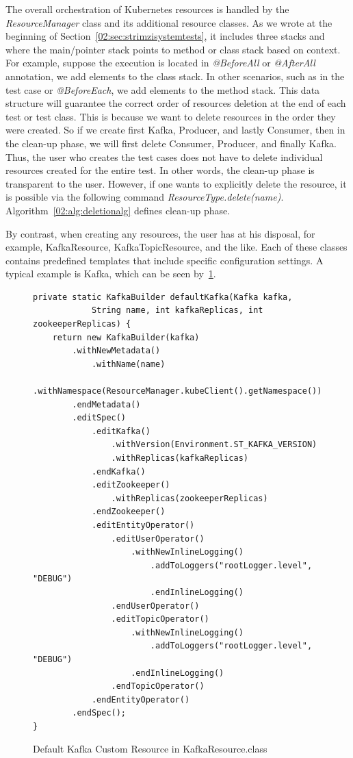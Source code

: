 The overall orchestration of Kubernetes resources is handled by the \emph{ResourceManager} class and its additional resource classes.
As we wrote at the beginning of Section~\ref{02:sec:strimzisystemtests}, it includes three stacks and where the main/pointer stack points to method or class stack based on context.
For example, suppose the execution is located in \emph{@BeforeAll} or \emph{@AfterAll} annotation, we add elements to the class stack.
In other scenarios, such as in the test case or \emph{@BeforeEach}, we add elements to the method stack.
This data structure will guarantee the correct order of resources deletion at the end of each test or test class.
This is because we want to delete resources in the order they were created.
So if we create first Kafka, Producer, and lastly Consumer, then in the clean-up phase, we will first delete Consumer, Producer, and finally Kafka.
Thus, the user who creates the test cases does not have to delete individual resources created for the entire test.
In other words, the clean-up phase is transparent to the user.
However, if one wants to explicitly delete the resource, it is possible via the following command \emph{ResourceType.delete(name)}.
Algorithm~\ref{02:alg:deletionalg} defines clean-up phase.


By contrast, when creating any resources, the user has at his disposal, for example, KafkaResource, KafkaTopicResource, and the like.
Each of these classes contains predefined templates that include specific configuration settings.
A typical example is Kafka, which can be seen by~\ref{02:fig:kafkaresource:defaultmethod}.

\begin{figure}[!ht]
\begin{lstlisting}
private static KafkaBuilder defaultKafka(Kafka kafka,
            String name, int kafkaReplicas, int zookeeperReplicas) {
    return new KafkaBuilder(kafka)
        .withNewMetadata()
            .withName(name)
            .withNamespace(ResourceManager.kubeClient().getNamespace())
        .endMetadata()
        .editSpec()
            .editKafka()
                .withVersion(Environment.ST_KAFKA_VERSION)
                .withReplicas(kafkaReplicas)
            .endKafka()
            .editZookeeper()
                .withReplicas(zookeeperReplicas)
            .endZookeeper()
            .editEntityOperator()
                .editUserOperator()
                    .withNewInlineLogging()
                        .addToLoggers("rootLogger.level", "DEBUG")
                        .endInlineLogging()
                .endUserOperator()
                .editTopicOperator()
                    .withNewInlineLogging()
                        .addToLoggers("rootLogger.level", "DEBUG")
                    .endInlineLogging()
                .endTopicOperator()
            .endEntityOperator()
        .endSpec();
}
\end{lstlisting}
    \caption{Default Kafka Custom Resource in KafkaResource.class}
    \label{02:fig:kafkaresource:defaultmethod}
\end{figure}

